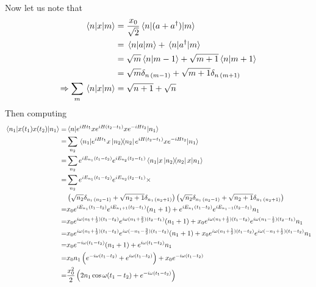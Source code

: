 \documentclass[a4paper,11pt]{article}
\begin{document}
Now let us note that
\begin{equation}
	\begin{aligned}
		\mel{n}{x}{m}&=\frac{x_0}{\sqrt{2}}\mel{n}{(a+a^\dagger)}{m}\\
		&=\mel{n}{a}{m}+\mel{n}{a^\dagger}{m}\\
		&=\sqrt{m}\braket{n}{m-1}+\sqrt{m+1}\braket{n}{m+1}\\
		&=\sqrt{m}\delta_{n\,(m-1)}+\sqrt{m+1}\delta_{n\,(m+1)}\\
		\Rightarrow\sum_m\mel{n}{x}{m}&=\sqrt{n+1}+\sqrt{n}
	\end{aligned}
\end{equation}
Then computing
\begin{equation}
	\begin{aligned}
		\mel{n_1}{x(t_1)x(t_2)}{n_1}=&\mel{n}{e^{iHt_1}xe^{iH(t_2-t_1)}xe^{-iHt_2}}{n_1}\\
		=&\sum_{n_2}\mel{n_1}{e^{iHt_1}x\dyad{n_2}{n_2}e^{iH(t_2-t_1)}xe^{-iHt_2}}{n_1}
		\\
		=&\sum_{n_2}e^{iE_{n_1}(t_1-t_2)}e^{iE_{n_2}(t_2-t_1)}\mel{n_1}{x\dyad{n_2}{n_2}x}{n_1}
		\\
		=&\sum_{n_2} e^{iE_{n_1}(t_1-t_2)}e^{iE_{n_2}(t_2-t_1)}\times \\
		&\left(\sqrt{n_2}\delta_{n_1\,(n_2-1)}+\sqrt{n_2+1}\delta_{n_1\,(n_2+1)}\right)\left(\sqrt{n_2}\delta_{n_1\,(n_2-1)}+\sqrt{n_2+1}\delta_{n_1 \,(n_2+1)}\right)
		\\
		=&x_0e^{iE_{n_1}(t_1-t_2)}e^{iE_{n_1+1}(t_2-t_1)}(n_{1}+1)+e^{iE_{n_1}(t_1-t_2)}e^{iE_{n_1-1}(t_2-t_1)}n_1
		\\
		=&x_0e^{i\omega(n_1+\frac{1}{2})(t_1-t_2)}e^{i\omega(n_1+\frac{3}{2})(t_2-t_1)}(n_{1}+1)+x_0e^{i\omega(n_1+\frac{1}{2})(t_1-t_2)}e^{i\omega(n_1-\frac{1}{2})(t_2-t_1)}n_1
		\\
		=&x_0e^{i\omega(n_1+\frac{1}{2})(t_1-t_2)}e^{i\omega(-n_1-\frac{3}{2})(t_1-t_2)}(n_{1}+1)+x_0e^{i\omega(n_1+\frac{1}{2})(t_1-t_2)}e^{i\omega(-n_1+\frac{1}{2})(t_1-t_2)}n_1
		\\
		=&x_0e^{-i\omega(t_1-t_2)}(n_{1}+1)+e^{i\omega(t_1-t_2)}n_1
	\\
	=&x_0n_{1}\left(e^{-i\omega(t_1-t_2)}+e^{i\omega(t_1-t_2)}\right)+x_0e^{-i\omega(t_1-t_2)}
		\\
	=&\frac{x_0^2}{2}\left(2n_1\cos{\omega (t_1-t_2)}+e^{-i\omega(t_1-t_2)}\right)
	\end{aligned}
\end{equation}
\end{document}
